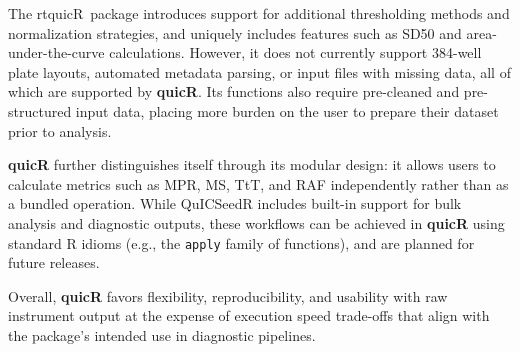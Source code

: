 \documentclass[preprint,12pt,a4paper]{elsarticle}
\begin{document}
            The rtquicR\ package introduces support for additional thresholding methods and normalization strategies, and uniquely includes features such as SD50 and area-under-the-curve calculations. However, it does not currently support 384-well plate layouts, automated metadata parsing, or input files with missing data, all of which are supported by \textbf{quicR}. Its functions also require pre-cleaned and pre-structured input data, placing more burden on the user to prepare their dataset prior to analysis.

            \textbf{quicR} further distinguishes itself through its modular design: it allows users to calculate metrics such as MPR, MS, TtT, and RAF independently rather than as a bundled operation. While QuICSeedR includes built-in support for bulk analysis and diagnostic outputs, these workflows can be achieved in \textbf{quicR} using standard R idioms (e.g., the \texttt{apply} family of functions), and are planned for future releases.

            Overall, \textbf{quicR} favors flexibility, reproducibility, and usability with raw instrument output at the expense of execution speed trade-offs that align with the package’s intended use in diagnostic pipelines.
\end{document}
